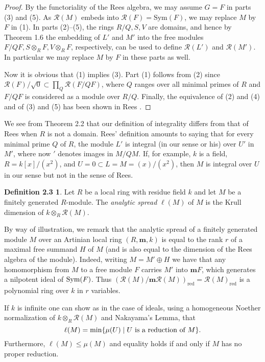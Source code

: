 \documentclass{proc-l}
\theoremstyle{plain}
\theoremstyle{definition}
\newtheorem*{definition6}{Definition 2.3}
\newcommand{\R}{\mathcal R}
\newcommand{\m}{\mathbf m}
\newcommand{\Sym}{\hbox {\rm Sym}}
\begin{document}
\begin{proof} By the functoriality of the Rees algebra, we may
assume $G=F$ in parts (3) and (5). As ${\R }(M)$ embeds into
${\R }(F) = \text{Sym}(F)$, we may replace $M$ by $F$ in (1).  In
parts (2)--(5), the rings $R/Q, S, V$ are domains, and hence by
Theorem 1.6 the embedding of $L'$ and $M'$ into the free modules $F/QF,
S\otimes _{R}F, V\otimes _{R}F$, respectively, can be used to define $\R(L')$
and 
${\R }(M')$.  In particular we may replace $M$ by $F$ in these parts as
well.

Now it is obvious that (1) implies (3).  Part (1) follows from (2)
since ${\R }(F)/\sqrt {0} \subset \prod _{Q} {\R }(F/QF)$, where $Q$
ranges over all minimal primes of $R$ and $F/QF$ is considered as
a module over $R/Q$. Finally, the equivalence of (2) and (4) and
of (3) and (5) has been shown in Rees \cite[1.5(ii)]{R}. \end{proof}


We see from Theorem 2.2 that our definition of integrality differs
from that of Rees \cite[p. 435]{R} when $R$ is not a domain. Rees'
definition amounts to saying that for every minimal prime $Q$ of
$R$, the module $L'$ is integral (in our sense or his) over $U'$
in $M'$, where now $'$ denotes images in $M/QM$. If, for example,
$k$ is a field, $R = k[x]/(x^{2})$, and $U = 0 \subset L = M =
(x)/(x^{2})$, then $M$ is integral over $U$ in our sense but not in
the sense of Rees.

\begin{definition6} Let $R$ be a local ring
with residue field $k$ and let $M$ be a finitely generated
$R$-module.  The {\em analytic spread} $\ell (M)$ of $M$ is the
Krull dimension of $k \otimes _{R} \R (M)$.
\end{definition6}


By way of illustration, we remark that the analytic spread of a
finitely generated module $M$ over an Artinian local ring $(R,\m ,
k)$ is equal to the rank $r$ of a maximal free summand $H$ of $M$
(and is also equal to the dimension of the Rees algebra of the
module). Indeed, writing $M=M'\oplus H$  we have that any
homomorphism from $M$ to a free module $F$ carries $M'$ into $\m F$, which generates a nilpotent ideal of $\Sym (F)$. Thus
$(\R (M)/\m \R (M))_{\text{red}}=\R (M)_{\text{red}}$ is a
polynomial ring over $k$ in $r$ variables.

If $k$ is infinite one can show as in the case of ideals, using a
homogeneous Noether normalization of $k \otimes _{R} {\R }(M)$ and
Nakayama's Lemma, that
\begin{equation*}\ell (M) = \min \{\mu (U) \mid U \hbox { is a reduction of }M\}.
\end{equation*}
Furthermore, $\ell (M) \leq \mu (M)$ and equality holds if and only
if $M$ has no proper reduction.
\end{document}
